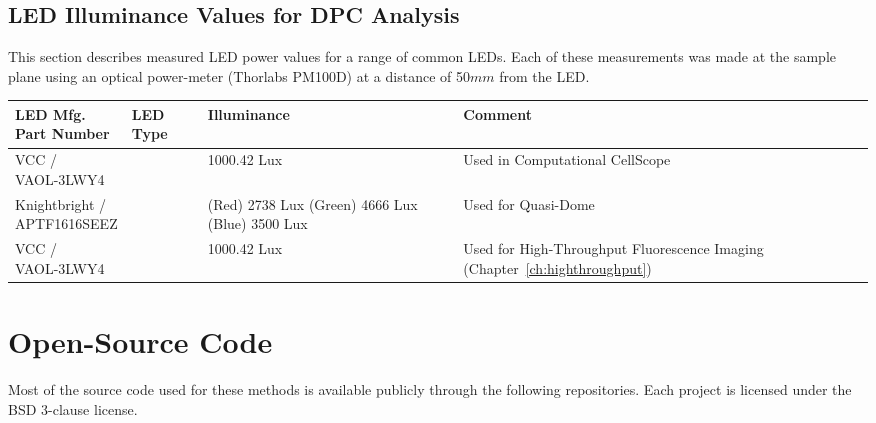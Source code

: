 \subsection{LED Illuminance Values for DPC Analysis}\label{sec:appendix:dpc_led_power}
This section describes measured LED power values for a range of common LEDs. Each of these measurements was made at the sample plane using an optical power-meter (Thorlabs PM100D) at a distance of 50$mm$ from the LED.
\begin{center}
    \begin{tabular}{ | p{32mm} | p{17mm} | p{32mm} | p{70mm} |}
    \hline
    \textbf{\centering LED Mfg. \newline Part Number} & \textbf{LED Type} & \textbf{Illuminance} & \textbf{Comment} \\
    \hline
    \centering{VCC / \newline VAOL-3LWY4} & \centering{Through-hole} & 1000.42 Lux & Used in Computational CellScope~\cite{phillips2015multi}\\
    \hline
    \centering{Knightbright / \newline APTF1616SEEZ} & \centering{SMD} & (Red) 2738 Lux \newline (Green) 4666 Lux \newline (Blue) 3500 Lux & Used for Quasi-Dome~\cite{phillips2017quasi}\\
    \hline
    \centering{VCC / \newline VAOL-3LWY4} & \centering{Through-hole} & 1000.42 Lux & Used for High-Throughput Fluorescence Imaging (Chapter~\ref{ch:highthroughput})\\
    \hline
    \end{tabular}
\end{center}

\clearpage
\section{Open-Source Code} \label{sec:appendix:opensource}
Most of the source code used for these methods is available publicly through the following repositories. Each project is licensed under the BSD 3-clause license.


